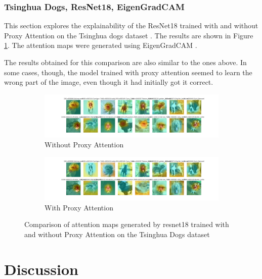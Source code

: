 \documentclass[a4paper,11pt,openright]{book}
\begin{document}
\subsection{Tsinghua Dogs, ResNet18, EigenGradCAM}
This section explores the explainability of the ResNet18 \cite{heDeepResidualLearning2016} trained with and without Proxy Attention on the Tsinghua dogs dataset \cite{zouNewDatasetDog2020}. The results are shown in Figure \ref{fig:resnet18_tsing}. The attention maps were generated using EigenGradCAM \cite{banymuhammadEigenCAMVisualExplanations2021}.

The results obtained for this comparison are also similar to the ones above. In some cases, though, the model trained with proxy attention seemed to learn the wrong part of the image, even though it had initially got it correct.

\begin{figure}[!htb]
    \begin{subfigure}[b]{1\textwidth}
        \includegraphics[width=\linewidth]{images/tsing_resnet18_noproxy_0.pdf}
        \caption{Without Proxy Attention}
    \end{subfigure}
    \begin{subfigure}[b]{1\textwidth}
        \includegraphics[width=\linewidth]{images/tsing_resnet18_proxy_0.pdf}
        \caption{With Proxy Attention}
    \end{subfigure}
    \caption{Comparison of attention maps generated by resnet18 trained with and without Proxy Attention on the Tsinghua Dogs dataset}
    \label{fig:resnet18_tsing}
\end{figure}

\chapter{Discussion} \label{ch:discussion}
\end{document}
